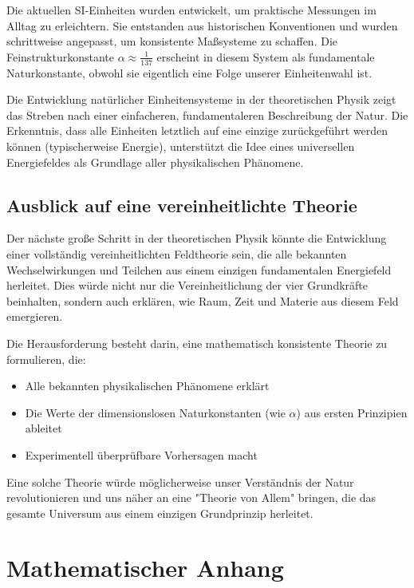 \documentclass{article}
\begin{document}
	Die aktuellen SI-Einheiten wurden entwickelt, um praktische Messungen im Alltag zu erleichtern. Sie entstanden aus historischen Konventionen und wurden schrittweise angepasst, um konsistente Maßsysteme zu schaffen. Die Feinstrukturkonstante $\alpha \approx \frac{1}{137}$ erscheint in diesem System als fundamentale Naturkonstante, obwohl sie eigentlich eine Folge unserer Einheitenwahl ist.
	
	Die Entwicklung natürlicher Einheitensysteme in der theoretischen Physik zeigt das Streben nach einer einfacheren, fundamentaleren Beschreibung der Natur. Die Erkenntnis, dass alle Einheiten letztlich auf eine einzige zurückgeführt werden können (typischerweise Energie), unterstützt die Idee eines universellen Energiefeldes als Grundlage aller physikalischen Phänomene.
	
	\subsection{Ausblick auf eine vereinheitlichte Theorie}
	
	Der nächste große Schritt in der theoretischen Physik könnte die Entwicklung einer vollständig vereinheitlichten Feldtheorie sein, die alle bekannten Wechselwirkungen und Teilchen aus einem einzigen fundamentalen Energiefeld herleitet. Dies würde nicht nur die Vereinheitlichung der vier Grundkräfte beinhalten, sondern auch erklären, wie Raum, Zeit und Materie aus diesem Feld emergieren.
	
	Die Herausforderung besteht darin, eine mathematisch konsistente Theorie zu formulieren, die:
	
	\begin{itemize}
		\item Alle bekannten physikalischen Phänomene erklärt
		\item Die Werte der dimensionslosen Naturkonstanten (wie $\alpha$) aus ersten Prinzipien ableitet
		\item Experimentell überprüfbare Vorhersagen macht
	\end{itemize}
	
	Eine solche Theorie würde möglicherweise unser Verständnis der Natur revolutionieren und uns näher an eine "Theorie von Allem" bringen, die das gesamte Universum aus einem einzigen Grundprinzip herleitet.
	
	\section{Mathematischer Anhang}
	
\end{document}
